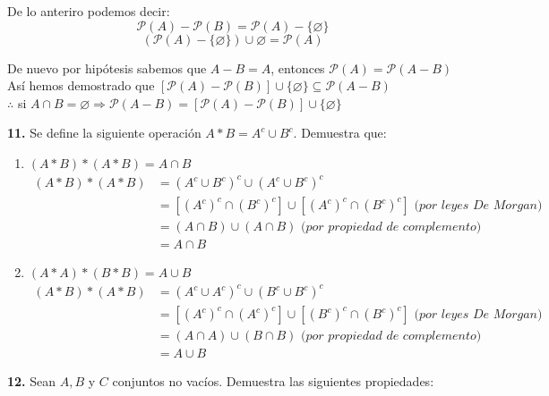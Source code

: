 \documentclass[12pt]{article}
\begin{document}
\begin{enumerate}[label=\alph*)]
    De lo anteriro podemos decir:
    \[\mathcal{P}(A) - \mathcal{P}(B) = \mathcal{P}(A) - \{\varnothing\}\]
    \[(\mathcal{P}(A) - \{\varnothing\}) \cup {\varnothing} = \mathcal{P}(A)\]

    De nuevo por hipótesis sabemos que $A - B = A$, entonces $\mathcal{P}(A) = \mathcal{P}(A - B)$\\

    Así hemos demostrado que $[\mathcal{P}(A) - \mathcal{P}(B)] \cup \{\varnothing\} \subseteq \mathcal{P}(A - B)$\\

    $\therefore$ si $A \cap B = \varnothing \Longrightarrow \mathcal{P}(A - B) = [\mathcal{P}(A) - \mathcal{P}(B)] \cup \{\varnothing\}$
\end{enumerate}

%
%
\textbf{11.} Se define la siguiente operación $A \ast B = A^c \cup B^c$. Demuestra que:

\begin{enumerate}[label=\alph*)]
    \item $(A \ast B) \ast (A \ast B) = A \cap B$
    \begin{align*}
        (A \ast B) \ast (A \ast B) &= (A^c \cup B^c)^c \cup (A^c \cup B^c)^c\\
        &=[(A^c)^c \cap (B^c)^c] \cup [(A^c)^c \cap (B^c)^c] \textit{ (por leyes De Morgan)}\\
        &= (A \cap B) \cup (A \cap B) \textit{ (por propiedad de complemento)}\\
        &= A \cap B
    \end{align*}

    \item $(A \ast A) \ast (B \ast B) = A \cup B$
    \begin{align*}
        (A \ast B) \ast (A \ast B) &= (A^c \cup A^c)^c \cup (B^c \cup B^c)^c\\
        &=[(A^c)^c \cap (A^c)^c] \cup [(B^c)^c \cap (B^c)^c] \textit{ (por leyes De Morgan)}\\
        &= (A \cap A) \cup (B \cap B) \textit{ (por propiedad de complemento)}\\
        &= A \cup B
    \end{align*}

\end{enumerate}

%
%
\textbf{12.} Sean $A, B$ y $C$ conjuntos no vacíos. Demuestra las siguientes propiedades:
\end{document}
